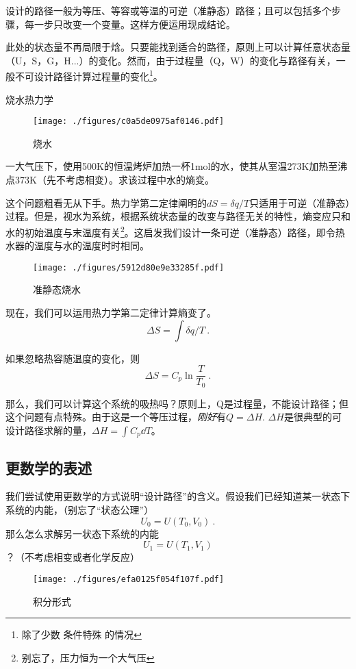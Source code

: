 设计的路径一般为等压、等容或等温的可逆（准静态）路径；且可以包括多个步骤，每一步只改变一个变量。这样方便运用现成结论。

此处的状态量不再局限于焓。只要能找到适合的路径，原则上可以计算任意状态量（U，S，G，H...）的变化。然而，由于过程量（Q，W）的变化与路径有关，一般不可设计路径计算过程量的变化\footnote{除了少数 条件特殊 的情况}。

\begin{example}{烧水热力学}
\begin{figure}[ht]
\centering
\texttt{[image: ./figures/c0a5de0975af0146.pdf]}
\caption{烧水} \label{fig_Hess_3}
\end{figure}
一大气压下，使用500K的恒温烤炉加热一杯1mol的水，使其从室温273K加热至沸点373K（先不考虑相变）。求该过程中水的熵变。

这个问题粗看无从下手。热力学第二定律阐明的$dS=\delta q/T$只适用于可逆（准静态）过程。但是，视水为系统，根据系统状态量的改变与路径无关的特性，熵变应只和水的初始温度与末温度有关\footnote{别忘了，压力恒为一个大气压}。这启发我们设计一条可逆（准静态）路径，即令热水器的温度与水的温度时时相同。

\begin{figure}[ht]
\centering
\texttt{[image: ./figures/5912d80e9e33285f.pdf]}
\caption{准静态烧水} \label{fig_Hess_4}
\end{figure}
现在，我们可以运用热力学第二定律计算熵变了。
$$\Delta S=\int \delta q/T~.$$

如果忽略热容随温度的变化，则 
$$\Delta S=C_p \ln \frac{T}{T_0}~.$$

那么，我们可以计算这个系统的吸热吗？原则上，Q是过程量，不能设计路径；但这个问题有点特殊。由于这是一个等压过程，\textsl{刚好}有$Q=\Delta H$. $\Delta H$是很典型的可设计路径求解的量，$\Delta H = \int C_p \dd T$。
\end{example}

\subsection{更数学的表述}
我们尝试使用更数学的方式说明“设计路径”的含义。假设我们已经知道某一状态下系统的内能，（别忘了“状态公理”）
$$U_0=U(T_0,V_0)~.$$
那么怎么求解另一状态下系统的内能
$$U_1=U(T_1,V_1)$$
？（不考虑相变或者化学反应）

\begin{figure}[ht]
\centering
\texttt{[image: ./figures/efa0125f054f107f.pdf]}
\caption{积分形式} \label{fig_Hess_5}
\end{figure}

